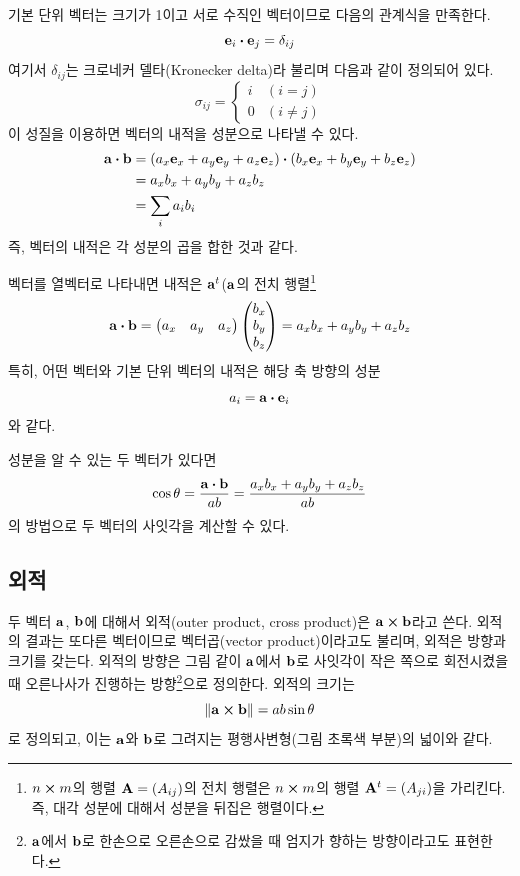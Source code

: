 기본 단위 벡터는 크기가 1이고 서로 수직인 벡터이므로 다음의 관계식을 만족한다.
\[
  \vb{e}_i \vdot \vb{e}_j  = \delta_{ij}
\]
여기서 $\delta_{ij}$는 크로네커 델타(Kronecker delta)라 불리며 다음과 같이 정의되어 있다.
\[
  \sigma_{ij} = \begin{cases}
    i & (i = j)    \\
    0 & (i \neq j)
  \end{cases}
\]
이 성질을 이용하면 벡터의 내적을 성분으로 나타낼 수 있다.
\begin{align*}
  \vb{a} \vdot \vb{b} & = (a_x \vb{e}_x + a_y \vb{e}_y + a_z \vb{e}_z) \vdot (b_x \vb{e}_x + b_y \vb{e}_y + b_z \vb{e}_z) \\
                      & = a_x b_x + a_y b_y + a_z b_z                                                                     \\
                      & = \sum_i{a_i b_i}
\end{align*}
즉, 벡터의 내적은 각 성분의 곱을 합한 것과 같다.

벡터를 열벡터로 나타내면 내적은 $\vb{a}^t$($\vb{a}$의 전치 행렬\footnote{$n \cp m$의 행렬 $\vb{A} = (A_{ij})$의 전치 행렬은 $n \cp m$의 행렬 $\vb{A}^t = (A_{ji})$을 가리킨다. 즉, 대각 성분에 대해서 성분을 뒤집은 행렬이다.}
\[
  \vb{a} \vdot \vb{b} = \begin{pmatrix}
    a_x & a_y & a_z
  \end{pmatrix} \begin{pmatrix}
    b_x \\
    b_y \\
    b_z
  \end{pmatrix} = a_x b_x + a_y b_y + a_z b_z
\]
특히, 어떤 벡터와 기본 단위 벡터의 내적은 해당 축 방향의 성분
\[
  a_i = \vb{a} \vdot \vb{e}_i
\]
와 같다.

성분을 알 수 있는 두 벡터가 있다면
\[
  \cos{\theta} = \frac{\vb{a} \vdot \vb{b}}{ab} = \frac{a_x b_x + a_y b_y + a_z b_z}{ab}
\]
의 방법으로 두 벡터의 사잇각을 계산할 수 있다.

\subsection{외적}
두 벡터 $\vb{a}$, $\vb{b}$에 대해서 외적(outer product, cross product)은 $\vb{a} \cp \vb{b}$라고 쓴다. 외적의 결과는 또다른 벡터이므로 벡터곱(vector product)이라고도 불리며, 외적은 방향과 크기를 갖는다. 외적의 방향은 그림  같이 $\vb{a}$에서 $\vb{b}$로 사잇각이 작은 쪽으로 회전시켰을 때 오른나사가 진행하는 방향\footnote{$\vb{a}$에서 $\vb{b}$로 한손으로 오른손으로 감쌌을 때 엄지가 향하는 방향이라고도 표현한다.}으로 정의한다. 외적의 크기는
\[
  \norm{\vb{a} \cp \vb{b}} = ab \sin{\theta}
\]
로 정의되고, 이는 $\vb{a}$와 $\vb{b}$로 그려지는 평행사변형(그림  초록색 부분)의 넓이와 같다.